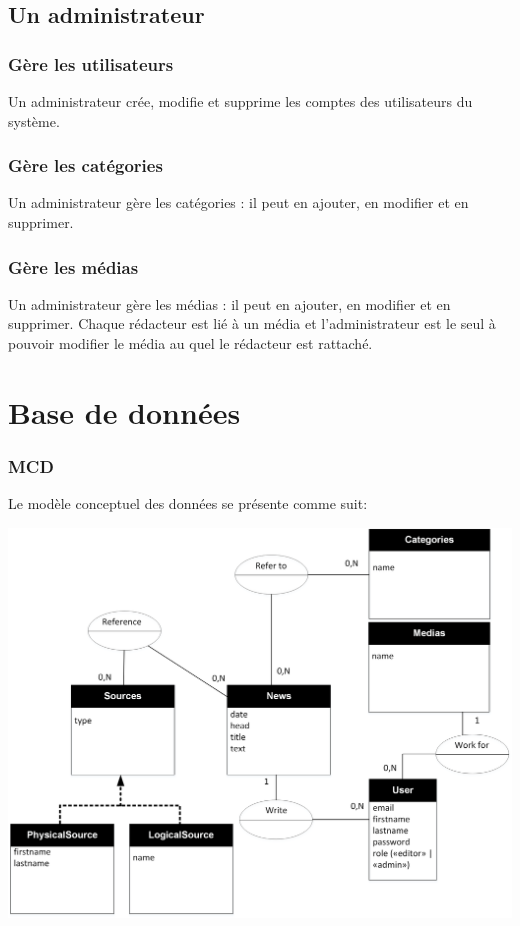 \documentclass{article}
\begin{document}
\subsection{Un administrateur}

\subsubsection{Gère les utilisateurs}

Un administrateur crée, modifie et supprime les comptes des utilisateurs du système.

\subsubsection{Gère les catégories}

Un administrateur gère les catégories : il peut en ajouter, en modifier et en supprimer.

\subsubsection{Gère les médias}

Un administrateur gère les médias : il peut en ajouter, en modifier et en supprimer. Chaque rédacteur est lié à un média et l'administrateur est le seul à pouvoir modifier le média au quel le rédacteur est rattaché.

\newpage
\section{Base de données}

\subsubsection{MCD}

Le modèle conceptuel des données se présente comme suit:

\includegraphics[width=\textwidth]{mcd}
\end{document}
